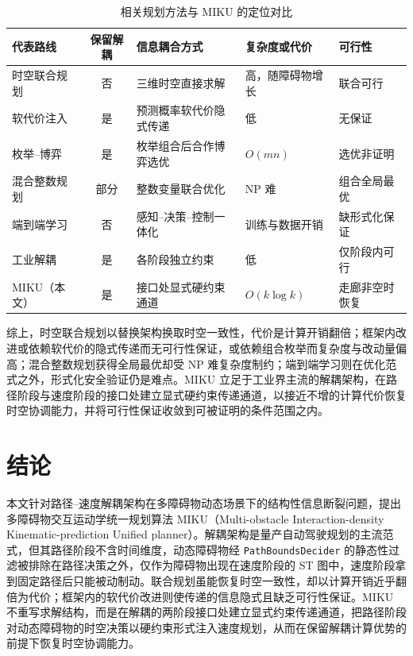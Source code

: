 \documentclass[a4paper,11pt]{ctexart}
\theoremstyle{definition}
\begin{document}
\begin{table}[t]
\centering
\footnotesize
\setlength{\tabcolsep}{4pt}
\caption{相关规划方法与 MIKU 的定位对比}
\label{tab:related}
\begin{tabular}{@{}lcp{3.0cm}p{2.6cm}p{2.8cm}@{}}
\toprule
代表路线 & 保留解耦 & 信息耦合方式 & 复杂度或代价 & 可行性 \\
\midrule
时空联合规划 & 否 & 三维时空直接求解 & 高，随障碍物增长 & 联合可行 \\
软代价注入 & 是 & 预测概率软代价隐式传递 & 低 & 无保证 \\
枚举--博弈 & 是 & 枚举组合后合作博弈选优 & $O(mn)$ & 选优非证明 \\
混合整数规划 & 部分 & 整数变量联合优化 & NP 难 & 组合全局最优 \\
端到端学习 & 否 & 感知--决策--控制一体化 & 训练与数据开销 & 缺形式化保证 \\
工业解耦 & 是 & 各阶段独立约束 & 低 & 仅阶段内可行 \\
MIKU（本文） & 是 & 接口处显式硬约束通道 & $O(k\log k)$ & 走廊非空时恢复 \\
\bottomrule
\end{tabular}
\end{table}

综上，时空联合规划以替换架构换取时空一致性，代价是计算开销翻倍；框架内改进或依赖软代价的隐式传递而无可行性保证，或依赖组合枚举而复杂度与改动量偏高；混合整数规划获得全局最优却受 NP 难复杂度制约；端到端学习则在优化范式之外，形式化安全验证仍是难点。MIKU 立足于工业界主流的解耦架构，在路径阶段与速度阶段的接口处建立显式硬约束传递通道，以接近不增的计算代价恢复时空协调能力，并将可行性保证收敛到可被证明的条件范围之内。

\section{结论}
\label{sec:conclusion}

本文针对路径--速度解耦架构在多障碍物动态场景下的结构性信息断裂问题，提出多障碍物交互运动学统一规划算法 MIKU（Multi-obstacle Interaction-density Kinematic-prediction Unified planner）。解耦架构是量产自动驾驶规划的主流范式，但其路径阶段不含时间维度，动态障碍物经 \texttt{PathBoundsDecider} 的静态性过滤被排除在路径决策之外，仅作为障碍物出现在速度阶段的 ST 图中，速度阶段拿到固定路径后只能被动制动。联合规划虽能恢复时空一致性，却以计算开销近乎翻倍为代价；框架内的软代价改进则使传递的信息隐式且缺乏可行性保证。MIKU 不重写求解结构，而是在解耦的两阶段接口处建立显式约束传递通道，把路径阶段对动态障碍物的时空决策以硬约束形式注入速度规划，从而在保留解耦计算优势的前提下恢复时空协调能力。
\end{document}

